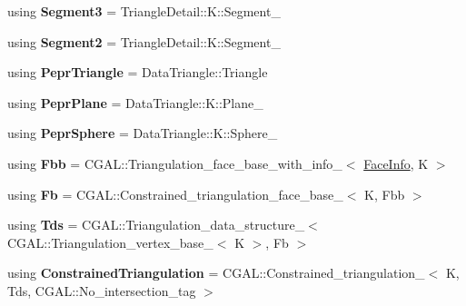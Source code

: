 \begin{DoxyCompactItemize}
\mbox{\label{classpepr3d_1_1_triangle_detail_ab0d804fda63bc0e77791140b7aa0f5b8}} 
using {\bfseries Segment3} = Triangle\+Detail\+::\+K\+::\+Segment\+\_
\item 
\mbox{\label{classpepr3d_1_1_triangle_detail_a198d39df083f914a5885befc81ae9220}} 
using {\bfseries Segment2} = Triangle\+Detail\+::\+K\+::\+Segment\+\_
\item 
\mbox{\label{classpepr3d_1_1_triangle_detail_aca7cfbf857504802dd7e5de02c107565}} 
using {\bfseries Pepr\+Triangle} = Data\+Triangle\+::\+Triangle
\item 
\mbox{\label{classpepr3d_1_1_triangle_detail_a09abf37409b283619fb5448bbdd08e7d}} 
using {\bfseries Pepr\+Plane} = Data\+Triangle\+::\+K\+::\+Plane\+\_
\item 
\mbox{\label{classpepr3d_1_1_triangle_detail_a19cdbad7a9cc454e6d4a0b9573793278}} 
using {\bfseries Pepr\+Sphere} = Data\+Triangle\+::\+K\+::\+Sphere\+\_
\item 
\mbox{\label{classpepr3d_1_1_triangle_detail_a4966cf22583406b8fe0f171b09ff7fd5}} 
using {\bfseries Fbb} = C\+G\+A\+L\+::\+Triangulation\+\_\+face\+\_\+base\+\_\+with\+\_\+info\+\_$<$ \mbox{\hyperlink{structpepr3d_1_1_triangle_detail_1_1_face_info}{Face\+Info}}, K $>$
\item 
\mbox{\label{classpepr3d_1_1_triangle_detail_a3bfe107a55791ce912d291832f1c3c5f}} 
using {\bfseries Fb} = C\+G\+A\+L\+::\+Constrained\+\_\+triangulation\+\_\+face\+\_\+base\+\_$<$ K, Fbb $>$
\item 
\mbox{\label{classpepr3d_1_1_triangle_detail_a7ea6f709dd9bead683d75616fde6657f}} 
using {\bfseries Tds} = C\+G\+A\+L\+::\+Triangulation\+\_\+data\+\_\+structure\+\_$<$ C\+G\+A\+L\+::\+Triangulation\+\_\+vertex\+\_\+base\+\_$<$ K $>$, Fb $>$
\item 
\mbox{\label{classpepr3d_1_1_triangle_detail_a68c7fa9d0ed3fd567a38f771f69b48b6}} 
using {\bfseries Constrained\+Triangulation} = C\+G\+A\+L\+::\+Constrained\+\_\+triangulation\+\_$<$ K, Tds, C\+G\+A\+L\+::\+No\+\_\+intersection\+\_\+tag $>$
\end{DoxyCompactItemize}
